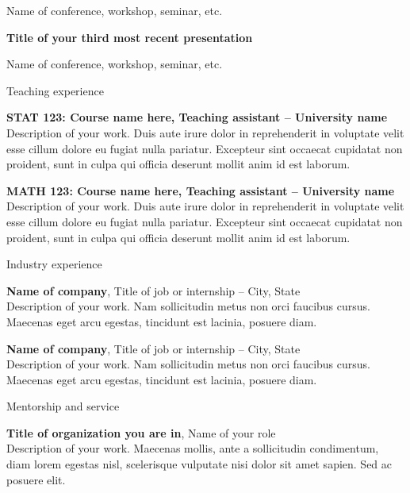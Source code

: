 \documentclass[letterpaper, 10pt]{article}
\newcommand{\heading}[1]{{\Large\color{Mahogany} #1}\medskip}
\begin{document}
Name of conference, workshop, seminar, etc. \medskip

\textbf{Title of your third most recent presentation}

Name of conference, workshop, seminar, etc. \medskip

\bigskip\bigskip


\heading{Teaching experience}

\textbf{STAT 123: Course name here, Teaching assistant -- University name} \\
Description of your work. Duis aute irure dolor in reprehenderit in voluptate velit esse cillum dolore eu fugiat nulla pariatur. Excepteur sint occaecat cupidatat non proident, sunt in culpa qui officia deserunt mollit anim id est laborum. \medskip

\textbf{MATH 123: Course name here, Teaching assistant -- University name} \\
Description of your work. Duis aute irure dolor in reprehenderit in voluptate velit esse cillum dolore eu fugiat nulla pariatur. Excepteur sint occaecat cupidatat non proident, sunt in culpa qui officia deserunt mollit anim id est laborum.

\bigskip\bigskip


\heading{Industry experience}

\textbf{Name of company}, Title of job or internship -- City, State \\
Description of your work. Nam sollicitudin metus non orci faucibus cursus. Maecenas eget arcu egestas, tincidunt est lacinia, posuere diam. \medskip

\textbf{Name of company}, Title of job or internship -- City, State \\
Description of your work. Nam sollicitudin metus non orci faucibus cursus. Maecenas eget arcu egestas, tincidunt est lacinia, posuere diam.

\bigskip\bigskip


\heading{Mentorship and service}

\textbf{Title of organization you are in}, Name of your role \\
Description of your work. Maecenas mollis, ante a sollicitudin condimentum, diam lorem egestas nisl, scelerisque vulputate nisi dolor sit amet sapien. Sed ac posuere elit. \medskip
\end{document}
